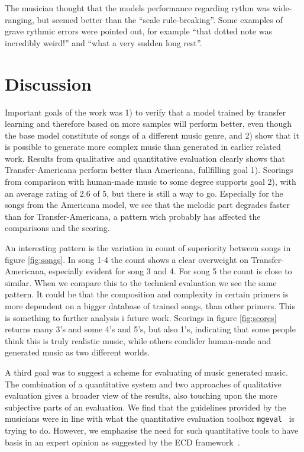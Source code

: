 \documentclass{IEEEtran}
\begin{document}
The musician thought that the models performance regarding rythm 
was wide-ranging, but seemed better than the ``scale rule-breaking''.
Some examples of grave rythmic errors were pointed out, for example
``that dotted note was incredibly weird!'' and  ``what a very sudden 
long rest''.

\section{Discussion}

Important goals of the work was 1) to verify that a model trained by transfer
learning and therefore based on more samples will perform better, even though
the base model constitute of songs of a different music genre, and 2) show
that it is possible to generate more complex music than generated in earlier
related work. Results from qualitative and quantitative evaluation clearly
shows that Transfer-Americana perform better than Americana, fullfilling goal
1). Scorings from comparison with human-made music to some degree supports
goal 2), with an average rating of 2.6 of 5, but there is still a way to go.
Especially for the songs from the Americana model, we see that the melodic
part degrades faster than for Transfer-Americana, a pattern wich probably has
affected the comparisons and the scoring.

An interesting pattern is the variation in count of superiority between songs
in figure \ref{fig:songs}. In song 1-4 the count shows a clear overweight on
Transfer-Americana, especially evident for song 3 and 4. For song 5 the count
is close to similar. When we compare this to the technical evaluation we see
the same pattern. It could be that the composition and complexity in
certain primers is more dependent on a bigger database of trained songs, than
other primers. This is something to further analysis i future work. Scorings
in figure \ref{fig:scores} returns many 3's and some 4's and 5's, but also
1's, indicating that some people think this is truly realistic music, while
others condider human-made and generated music as two different worlds.

A third goal was to suggest a scheme for evaluating of music generated music.
The combination of a quantitative system and two approaches of qualitative
evaluation gives a broader view of the results, also touching upon the more
subjective parts of an evaluation. We find that the guidelines provided by 
the musicians were in line with what the quantitative evaluation 
toolbox \lstinline|mgeval|~\cite{yang2020evaluation} is trying to 
do. However, we emphasise the need for such quantitative tools to have basis
in an expert opinion as suggested by the ECD
framework~\cite{mislevy2003focus,mislevy2017evidence}.
\end{document}
